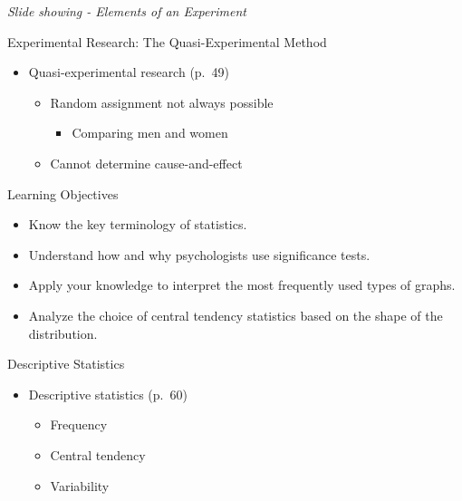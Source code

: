 \documentclass[
]{book}
\providecommand{\tightlist}{%
  \setlength{\itemsep}{0pt}\setlength{\parskip}{0pt}}
\begin{document}
\emph{Slide showing - Elements of an Experiment}

Experimental Research: The Quasi-Experimental Method

\begin{itemize}
\tightlist
\item
  Quasi-experimental research (p.~49)

  \begin{itemize}
  \tightlist
  \item
    Random assignment not always possible

    \begin{itemize}
    \tightlist
    \item
      Comparing men and women\\
    \end{itemize}
  \item
    Cannot determine cause-and-effect
  \end{itemize}
\end{itemize}

Learning Objectives

\begin{itemize}
\tightlist
\item
  Know the key terminology of statistics.\\
\item
  Understand how and why psychologists use significance tests.\\
\item
  Apply your knowledge to interpret the most frequently used types of graphs.\\
\item
  Analyze the choice of central tendency statistics based on the shape of the distribution.
\end{itemize}

Descriptive Statistics

\begin{itemize}
\tightlist
\item
  Descriptive statistics (p.~60)

  \begin{itemize}
  \tightlist
  \item
    Frequency\\
  \item
    Central tendency\\
  \item
    Variability
  \end{itemize}
\end{itemize}
\end{document}
